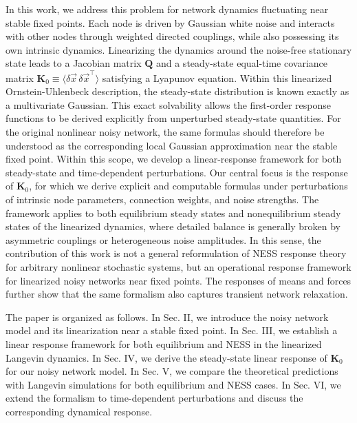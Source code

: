 In this work, we address this problem for network dynamics fluctuating near stable fixed points. Each node is driven by Gaussian white noise and interacts with other nodes through weighted directed couplings, while also possessing its own intrinsic dynamics. Linearizing the dynamics around the noise-free stationary state leads to a Jacobian matrix $\mathbf{Q}$ and a steady-state equal-time covariance matrix $\mathbf{K}_0 \equiv \langle \delta \vec{x}\,\delta \vec{x}^{\top} \rangle$ satisfying a Lyapunov equation. Within this linearized Ornstein-Uhlenbeck description, the steady-state distribution is known exactly as a multivariate Gaussian. This exact solvability allows the first-order response functions to be derived explicitly from unperturbed steady-state quantities. For the original nonlinear noisy network, the same formulas should therefore be understood as the corresponding local Gaussian approximation near the stable fixed point. Within this scope, we develop a linear-response framework for both steady-state and time-dependent perturbations. Our central focus is the response of $\mathbf{K}_0$, for which we derive explicit and computable formulas under perturbations of intrinsic node parameters, connection weights, and noise strengths. The framework applies to both equilibrium steady states and nonequilibrium steady states of the linearized dynamics, where detailed balance is generally broken by asymmetric couplings or heterogeneous noise amplitudes. In this sense, the contribution of this work is not a general reformulation of NESS response theory for arbitrary nonlinear stochastic systems, but an operational response framework for linearized noisy networks near fixed points. The responses of means and forces further show that the same formalism also captures transient network relaxation.\par

The paper is organized as follows. In Sec. II, we introduce the noisy network model and its linearization near a stable fixed point. In Sec. III, we establish a linear response framework for both equilibrium and NESS in the linearized Langevin dynamics. In Sec. IV, we derive the steady-state linear response of $\mathbf{K}_0$ for our noisy network model. In Sec. V, we compare the theoretical predictions with Langevin simulations for both equilibrium and NESS cases. In Sec. VI, we extend the formalism to time-dependent perturbations and discuss the corresponding dynamical response.
